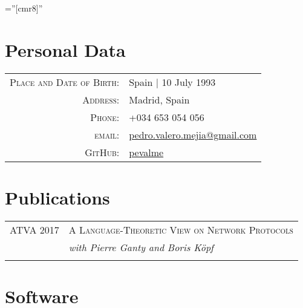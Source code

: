 \documentclass[a4paper,10pt]{article} %
\begin{document}
\pagestyle{empty} %

\font\fb=''[cmr8]'' %


\par{\bigskip\par} %

\section{Personal Data}

\begin{tabular}{rl}
\textsc{Place and Date of Birth:} & Spain  | 10 July 1993 \\
\textsc{Address:} & Madrid, Spain \\
\textsc{Phone:} & +034 653 054 056\\
\textsc{email:} & \href{mailto:pedro.valero.mejia@gmail.com}{pedro.valero.mejia@gmail.com} \\
\textsc{GitHub:} & \href{https://github.com/pevalme}{pevalme}
\end{tabular}


\section{Publications}
\begin{tabular}{rl}
\textsc{ATVA} 2017 & \textsc{A Language-Theoretic View on Network Protocols} \\
& \textit{with Pierre Ganty and Boris Köpf} \\
&\\
\end{tabular}


\section{Software}
\end{document}
